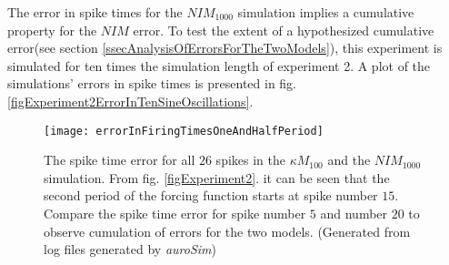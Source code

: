 			The error in spike times for the $NIM_{1000}$ simulation implies a cumulative property for the $NIM$ error.
			To test the extent of a hypothesized cumulative error(see section \ref{ssecAnalysisOfErrorsForTheTwoModels}), this experiment is simulated for ten times the simulation length of experiment 2.
			A plot of the simulations' errors in spike times is presented in fig. \ref{figExperiment2ErrorInTenSineOscillations}.
			
\begin{figure}[hbt!p]
	\centering
  		\texttt{[image: errorInFiringTimesOneAndHalfPeriod]}
  	\caption[Spike time error for all $26$ spikes of experiment 2]{
			 	The spike time error for all $26$ spikes in the $\kappa M_{100}$ and the $NIM_{1000}$ simulation.
				From fig. \ref{figExperiment2}. it can be seen that the second period of the forcing function starts at spike number $15$.
				Compare the spike time error for spike number $5$ and number $20$ to observe cumulation of errors for the two models.
				(Generated from log files generated by \emph{auroSim})
			}
  	\label{figSpikeTimeErrorExperiment2}
\end{figure}
			
			


